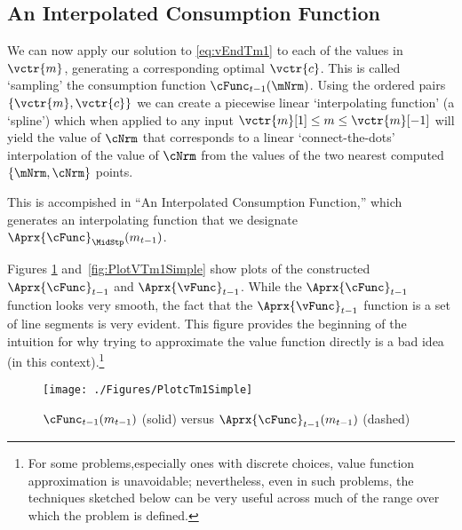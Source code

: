 \documentclass[\econtexRoot/SolvingMicroDSOPs]{subfiles}
\begin{document}
\hypertarget{an-interpolated-consumption-function}{}
\subsection{An Interpolated Consumption Function} \label{subsec:LinInterp}

We can now apply our solution to \eqref{eq:vEndTm1} to each of the values in $\vctr{m}$, generating a corresponding optimal $\vctr{c}$.  This is called `sampling' the consumption function $\cFunc_{\prdT-1}(\mNrm)$.  Using the ordered pairs $\{\vctr{m},\vctr{c}\}$ we can create a piecewise linear `interpolating function' (a `spline') which when applied to any input $\vctr{m}[1] \leq {m} \leq \vctr{m}[-1]$ will yield the value of $\cNrm$ that corresponds to a linear `connect-the-dots' interpolation of the value of $\cNrm$ from the values of the two nearest computed $\{\mNrm,\cNrm\}$ points.

This is accompished in ``An Interpolated Consumption Function,'' which generates an interpolating function that we designate $\Aprx{\cFunc}_{\MidStp}({m}_{\prdT-1})$. %

Figures \ref{fig:PlotcTm1Simple} and~\ref{fig:PlotVTm1Simple} show
plots of the constructed $\Aprx{\cFunc}_{\prdT-1}$ and $\Aprx{\vFunc}_{\prdT-1}$. While the $\Aprx{\cFunc}_{\prdT-1}$ function looks very smooth, the fact that the $\Aprx{\vFunc}_{\prdT-1}$ function is a set of line segments is very evident.  This figure provides the beginning of the intuition for why trying to approximate the value function directly is a bad idea (in this context).\footnote{For some problems,especially ones with discrete choices, value function approximation is unavoidable; nevertheless, even in such problems, the techniques sketched below can be very useful across much of the range over which the problem is defined.}

\hypertarget{PlotcTm1Simple}{}
\begin{figure}
  \centerline{\texttt{[image: ./Figures/PlotcTm1Simple]}}
  \caption{$\cFunc_{\prdT-1}({m}_{\prdT-1})$ (solid) versus $\Aprx{\cFunc}_{\prdT-1}({m}_{\prdT-1})$ (dashed)}
  \label{fig:PlotcTm1Simple}
\end{figure}
\end{document}
